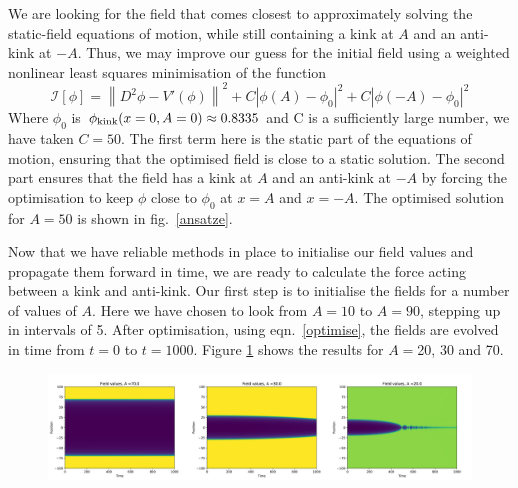 \documentclass[11pt, oneside]{article}  	%
\numberwithin{equation}{section}
\begin{document}
 We are looking for the field that comes closest to approximately solving the static-field equations of motion, while still containing a kink at $A$ and an anti-kink at $-A$. Thus, we may improve our guess for the initial field using a weighted nonlinear least squares minimisation of the function
 \begin{equation}\label{optimise}
 \mathcal{I}[\phi] = \left \| D^2\phi -V'\left( \phi \right) \right \|^2 + C\left | \phi(A) - \phi_0 \right |^2 + C\left | \phi(-A) - \phi_0 \right |^2
 \end{equation}
 Where $\phi_0$ is $\phi_{\textup{kink}}(x=0,A=0) \approx 0.8335$ and C is a sufficiently large number, we have taken $C = 50$. The first term here is the static part of the equations of motion, ensuring that the optimised field is close to a static solution. The second part ensures that the field has a kink at $A$ and an anti-kink at $-A$ by forcing the optimisation to keep $\phi$ close to $\phi_0$ at $x=A$ and $x=-A$. The optimised solution for $A=50$ is shown in fig.~\ref{ansatze}.\par
 Now that we have reliable methods in place to initialise our field values and propagate them forward in time, we are ready to calculate the force acting between a kink and anti-kink. Our first step is to initialise the fields for a number of values of $A$. Here we have chosen to look from $A=10$ to $A = 90$, stepping up in intervals of 5. After optimisation, using eqn.~\ref{optimise}, the fields are evolved in time from $t=0$ to $t=1000$. Figure \ref{field_evolutions} shows the results for $A =$20, 30 and 70.\par
 \begin{figure}
\centering
\includegraphics[width=\textwidth]{field_values}
 \label{field_evolutions}
\end{figure}
\end{document}
